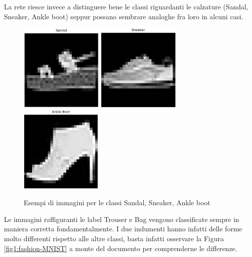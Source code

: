 La rete riesce invece a distinguere bene le classi riguardanti le calzature (Sandal, Sneaker, Ankle boot) seppur possano sembrare analoghe fra loro in alcuni casi.
\begin{figure}[!hbt]
\centering
\includegraphics[width=4cm]{images/sandal5bis.png}
\includegraphics[width=4cm]{images/sneaker7bis.png}
\includegraphics[width=4cm]{images/ankleboot9bis.png}
\caption{Esempi di immagini per le classi Sandal, Sneaker, Ankle boot}
\label{fig13:scarpe_example}
\end{figure}
Le immagini raffiguranti le label Trouser e Bag vengono classificate sempre in maniera corretta fondamentalmente. I due indumenti hanno infatti delle forme molto differenti rispetto alle altre classi, basta infatti osservare la Figura \ref{fig1:fashion-MNIST} a monte del documento per comprenderne le differenze.

